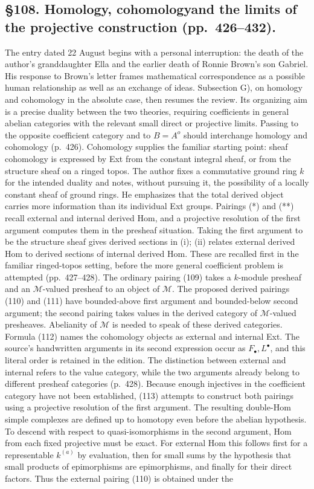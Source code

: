\documentclass[10pt,oneside]{book}
\begin{document}
\subsection*{\S108. Homology, cohomology\newline and the limits of the projective construction (pp.\ 426--432).}
The entry dated 22 August begins with a personal interruption: the death of the author's granddaughter Ella and the earlier death of Ronnie Brown's son Gabriel. His response to Brown's letter frames mathematical correspondence as a possible human relationship as well as an exchange of ideas. Subsection G), on homology and cohomology in the absolute case, then resumes the review. Its organizing aim is a precise duality between the two theories, requiring coefficients in general abelian categories with the relevant small direct or projective limits. Passing to the opposite coefficient category and to $B=A^o$ should interchange homology and cohomology (p.\ 426). Cohomology supplies the familiar starting point: sheaf cohomology is expressed by Ext from the constant integral sheaf, or from the structure sheaf on a ringed topos. The author fixes a commutative ground ring $k$ for the intended duality and notes, without pursuing it, the possibility of a locally constant sheaf of ground rings. He emphasizes that the total derived object carries more information than its individual Ext groups. Pairings (*) and (**) recall external and internal derived Hom, and a projective resolution of the first argument computes them in the presheaf situation. Taking the first argument to be the structure sheaf gives derived sections in (i); (ii) relates external derived Hom to derived sections of internal derived Hom. These are recalled first in the familiar ringed-topos setting, before the more general coefficient problem is attempted (pp.\ 427--428). The ordinary pairing (109) takes a $k$-module presheaf and an $\mathcal M$-valued presheaf to an object of $\mathcal M$. The proposed derived pairings (110) and (111) have bounded-above first argument and bounded-below second argument; the second pairing takes values in the derived category of $\mathcal M$-valued presheaves. Abelianity of $\mathcal M$ is needed to speak of these derived categories. Formula (112) names the cohomology objects as external and internal Ext. The source's handwritten arguments in its second expression occur as $F_\bullet,L^\bullet$, and this literal order is retained in the edition. The distinction between external and internal refers to the value category, while the two arguments already belong to different presheaf categories (p.\ 428). Because enough injectives in the coefficient category have not been established, (113) attempts to construct both pairings using a projective resolution of the first argument. The resulting double-Hom simple complexes are defined up to homotopy even before the abelian hypothesis. To descend with respect to quasi-isomorphisms in the second argument, Hom from each fixed projective must be exact. For external Hom this follows first for a representable $k^{(a)}$ by evaluation, then for small sums by the hypothesis that small products of epimorphisms are epimorphisms, and finally for their direct factors. Thus the external pairing (110) is obtained under the 
\end{document}
